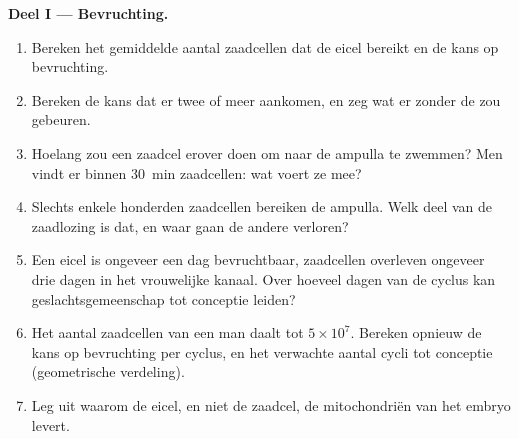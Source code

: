 \begin{problem}
\medskip
\noindent\textbf{Deel I --- Bevruchting.}
\begin{enumerate}
  \item Bereken het gemiddelde aantal zaadcellen dat de eicel bereikt en de
        kans op bevruchting.
  \item Bereken de kans dat er twee of meer aankomen, en zeg wat er zonder
        de  zou gebeuren.
  \item Hoelang zou een zaadcel erover doen om naar de ampulla te zwemmen?
        Men vindt er binnen \qty{30}{min} zaadcellen: wat voert ze mee?
  \item Slechts enkele honderden zaadcellen bereiken de ampulla. Welk deel
        van de zaadlozing is dat, en waar gaan de andere verloren?
  \item Een eicel is ongeveer een dag bevruchtbaar, zaadcellen overleven
        ongeveer drie dagen in het vrouwelijke kanaal. Over hoeveel dagen van
        de cyclus kan geslachtsgemeenschap tot conceptie leiden?
  \item Het aantal zaadcellen van een man daalt tot $5\times 10^{7}$.
        Bereken opnieuw de kans op bevruchting per cyclus, en het verwachte
        aantal cycli tot conceptie (geometrische verdeling).
  \item Leg uit waarom de eicel, en niet de zaadcel, de mitochondriën van
        het embryo levert.
\end{enumerate}


\end{problem}
